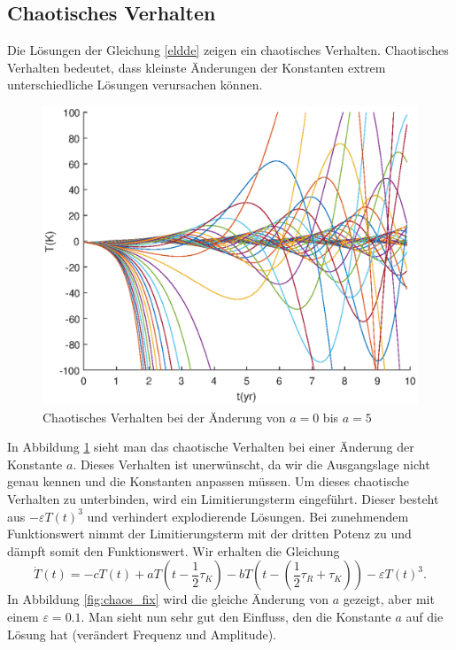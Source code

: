 \subsection{Chaotisches Verhalten}
Die Lösungen der Gleichung \eqref{eldde} zeigen ein chaotisches Verhalten.
Chaotisches Verhalten bedeutet, dass kleinste Änderungen der Konstanten extrem unterschiedliche Lösungen verursachen können. 
\begin{figure}
	\centering
	\includegraphics{verzoegert/inp/figures/param_a_e0.eps}
	\caption{Chaotisches Verhalten bei der Änderung von $a=0$ bis $a=5$}
	\label{fig:chaos}
\end{figure}
In Abbildung \ref{fig:chaos} sieht man das chaotische Verhalten bei einer Änderung der Konstante $a$.
Dieses Verhalten ist unerwünscht, da wir die Ausgangslage nicht genau kennen und die Konstanten anpassen müssen.
Um dieses chaotische Verhalten zu unterbinden, wird ein Limitierungsterm eingeführt.
Dieser besteht aus $-\varepsilon T(t)^3$ und verhindert explodierende Lösungen.
Bei zunehmendem Funktionswert nimmt der Limitierungsterm mit der dritten Potenz zu und dämpft somit den Funktionswert.
Wir erhalten die Gleichung
\begin{equation} \label{eldde_epsilon}
\dot{T}(t)=-cT(t)+aT(t-\frac{1}{2}\tau_K)-bT(t-(\frac{1}{2}\tau_R+\tau_K))-\varepsilon T(t)^3.
\end{equation}
In Abbildung \ref{fig:chaos_fix} wird die gleiche Änderung von $a$ gezeigt, aber mit einem $\varepsilon = 0.1$.
Man sieht nun sehr gut den Einfluss, den die Konstante $a$ auf die Lösung hat (verändert Frequenz und Amplitude).
